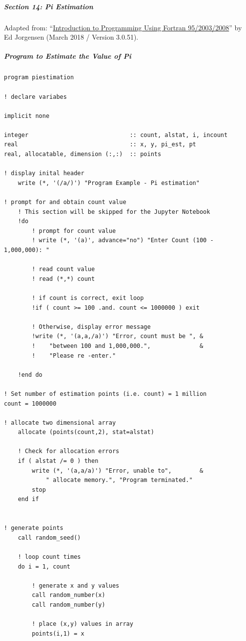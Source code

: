 \subparagraph{Section 14: Pi Estimation}

Adapted from: ``\href{https://open.umn.edu/opentextbooks/textbooks/introduction-to-programming-using-fortran-95-2003-2008}{Introduction to Programming Using Fortran 95/2003/2008}'' by Ed Jorgensen (March 2018 / Version 3.0.51).

\subparagraph{Program to Estimate the Value of Pi}

\begin{verbatim}
program piestimation

! declare variabes

implicit none

integer                             :: count, alstat, i, incount
real                                :: x, y, pi_est, pt
real, allocatable, dimension (:,:)  :: points

! display inital header
    write (*, '(/a/)') "Program Example - Pi estimation"

! prompt for and obtain count value
    ! This section will be skipped for the Jupyter Notebook
    !do
        ! prompt for count value
        ! write (*, '(a)', advance="no") "Enter Count (100 - 1,000,000): "

        ! read count value
        ! read (*,*) count

        ! if count is correct, exit loop
        !if ( count >= 100 .and. count <= 1000000 ) exit

        ! Otherwise, display error message
        !write (*, '(a,a,/a)') "Error, count must be ", &
        !    "between 100 and 1,000,000.",              &
        !    "Please re -enter."

    !end do

! Set number of estimation points (i.e. count) = 1 million
count = 1000000

! allocate two dimensional array
    allocate (points(count,2), stat=alstat)

    ! Check for allocation errors
    if ( alstat /= 0 ) then
        write (*, '(a,a/a)') "Error, unable to",        &
            " allocate memory.", "Program terminated."
        stop
    end if


! generate points
    call random_seed()

    ! loop count times
    do i = 1, count

        ! generate x and y values
        call random_number(x)
        call random_number(y)

        ! place (x,y) values in array
        points(i,1) = x
        

\end{verbatim}
